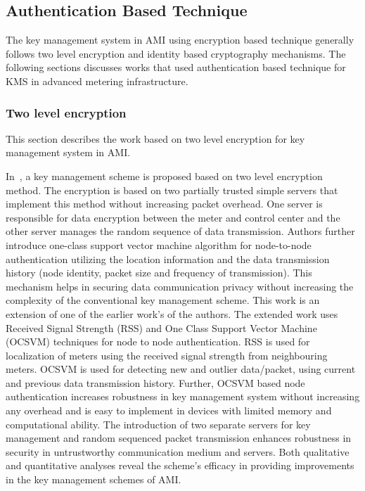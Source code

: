 \subsection{Authentication Based Technique}
The key management system in AMI using encryption based technique generally follows two level encryption and identity based cryptography mechanisms. The following sections discusses works that used authentication based technique for KMS in advanced metering infrastructure.

\subsubsection{Two level encryption}
This section describes the work based on two level encryption for key management system in AMI.  
\par In~\cite{Parvez17}, a key management scheme is proposed based on two level encryption method. The encryption is based on two partially trusted simple servers that implement this method without increasing packet overhead. One server is responsible for data encryption between the meter and control center and the other server manages the random sequence of data transmission. Authors further introduce one-class support vector machine algorithm for node-to-node authentication utilizing the location information and the data transmission history (node identity, packet size and frequency of transmission). This mechanism helps in securing data communication privacy without increasing the complexity of the conventional key management scheme. This work is an extension of one of the earlier work's of the authors. The extended work uses Received Signal Strength (RSS) and One Class Support Vector Machine (OCSVM) techniques for node to node authentication. RSS is used for localization of meters using the received signal strength from neighbouring meters. OCSVM is used for detecting new and outlier data/packet, using current and previous data transmission history. Further, OCSVM based node authentication increases robustness in key management system without increasing any overhead and is easy to implement in devices with limited memory and computational ability. The introduction of two separate servers for key management and random sequenced packet transmission enhances robustness in security in untrustworthy communication medium and servers. Both qualitative and quantitative analyses reveal the scheme's efficacy in providing improvements in the key management schemes of AMI.

